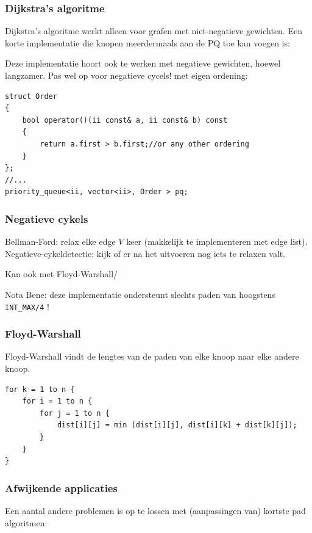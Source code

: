 \documentclass[10pt,a4paper,titlepage]{article}
\begin{document}
\subsubsection{Dijkstra's algoritme}

Dijkstra's algoritme werkt alleen voor grafen met niet-negatieve gewichten.
%
Een korte implementatie die knopen meerdermaals aan de PQ toe kan voegen is:

Deze implementatie hoort ook te werken met negatieve gewichten, hoewel langzamer. Pas wel op voor negatieve cycels!
met eigen ordening:
\begin{lstlisting}
struct Order
{
    bool operator()(ii const& a, ii const& b) const
    {
        return a.first > b.first;//or any other ordering
    }
};
//...
priority_queue<ii, vector<ii>, Order > pq;
\end{lstlisting}

\subsubsection{Negatieve cykels}
Bellman-Ford: relax elke edge $V$ keer (makkelijk te implementeren met edge list). Negatieve-cykeldetectie: kijk of er na het uitvoeren nog iets te relaxen valt.

Kan ook met Floyd-Warshall/

Nota Bene: deze implementatie ondersteunt slechts paden van hoogstens \lstinline{INT_MAX/4} !



\subsubsection{Floyd-Warshall}
Floyd-Warshall vindt de lengtes van de paden van elke knoop naar elke andere knoop.

\begin{lstlisting}
for k = 1 to n {
	for i = 1 to n {
		for j = 1 to n {
			dist[i][j] = min (dist[i][j], dist[i][k] + dist[k][j]);
		}
	}
}
\end{lstlisting}


\iffalse
\subsubsection{Afwijkende applicaties}
Een aantal andere problemen is op te lossen met (aanpassingen van) kortste pad algoritmen:
\end{document}
